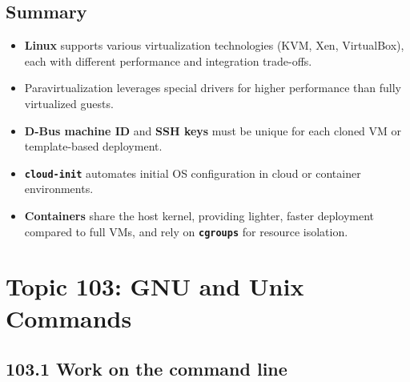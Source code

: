 \documentclass[12pt,a4paper]{report}
\begin{document}
\section*{Summary}

\begin{itemize}
    \item \textbf{Linux} supports various virtualization technologies (KVM, Xen, VirtualBox), each with different performance and integration trade-offs.
    \item Paravirtualization leverages special drivers for higher performance than fully virtualized guests.
    \item \textbf{D-Bus machine ID} and \textbf{SSH keys} must be unique for each cloned VM or template-based deployment.
    \item \textbf{\texttt{cloud-init}} automates initial OS configuration in cloud or container environments.
    \item \textbf{Containers} share the host kernel, providing lighter, faster deployment compared to full VMs, and rely on \textbf{\texttt{cgroups}} for resource isolation.
\end{itemize}




\chapter{Topic 103: GNU and Unix Commands}


\section*{103.1 Work on the command line}

\end{document}
